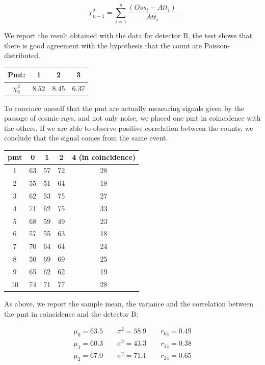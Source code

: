 \begin{equation}
\chi^{2}_{n-1} = \sum_{i = 1}^{n} \dfrac{(Oss_{i} - Att_{i})}{Att_{i}}
\end{equation}

We report the result obtained with the data for detector B, the test shows that there is good agreement with the hypothesis that the count are Poisson-distributed.

\begingroup
\setlength{\tabcolsep}{8pt} %
\renewcommand{\arraystretch}{1.2} %
\begin{center}
\begin{tabular}{|c|c|c|c|}
\hline 
Pmt: & 1 & 2 & 3 \\ 
\hline
$\chi^{2}_{9}$ & 8.52 & 8.45 & 6.37 \\ 
\hline
\end{tabular} 
\end{center}
\endgroup

To convince oneself that the pmt are actually measuring signals given by the passage of cosmic rays, and not only noise, we placed one pmt in coincidence with the others. If we are able to observe positive correlation between the counts, we conclude that the signal comes from the same event.

\begin{center}
\begin{tabular}{|c|c|c|c|c|}
\hline 
pmt & 0 & 1 & 2 & 4 (in coincidence) \\ 
\hline 
1 & 63 & 57 & 72 & 28 \\ 
\hline 
2 & 55 & 51 & 64 & 18 \\ 
\hline 
3 & 62 & 53 & 75 & 27 \\ 
\hline 
4 & 71 & 62 & 75 & 33 \\ 
\hline 
5 & 68 & 59 & 49 & 23 \\ 
\hline 
6 & 57 & 55 & 63 & 18 \\ 
\hline 
7 & 70 & 64 & 64 & 24 \\ 
\hline 
8 & 50 & 69 & 69 & 25 \\ 
\hline 
9 & 65 & 62 & 62 & 19 \\ 
\hline 
10 & 74 & 71 & 77 & 28 \\ 
\hline 
\end{tabular} 
\end{center} 

As above, we report the sample mean, the variance and the correlation between the pmt in coincidence and the detector B:

\begin{equation*}
\begin{split}
\mu_{0} = 63.5 \qquad \sigma^{2} = 58.9 \qquad r_{04} = 0.49 \\
\mu_{1} = 60.3 \qquad \sigma^{2} = 43.3 \qquad r_{14} = 0.38 \\
\mu_{2} = 67.0 \qquad \sigma^{2} = 71.1 \qquad r_{24} = 0.65 \\
\end{split}
\end{equation*}

